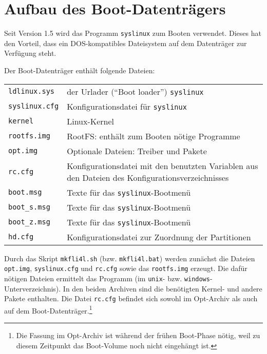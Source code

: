 \section{Aufbau des Boot-Datenträgers}

Seit Version 1.5 wird das Programm \texttt{syslinux} zum Booten verwendet.
Dieses hat den Vorteil, dass ein DOS-kompatibles Dateisystem auf dem
Datenträger zur Verfügung steht.

Der Boot-Datenträger enthält folgende Dateien:

\begin{table}[htbp]
\centering
\begin{tabular}[h!]{lp{10cm}}
\texttt{ldlinux.sys}             & der Urlader ("`Boot loader"') \texttt{syslinux} \\
\texttt{syslinux.cfg}            & Konfigurationsdatei für \texttt{syslinux} \\
\texttt{kernel}                  & Linux-Kernel\\
\texttt{rootfs.img}              & RootFS: enthält zum Booten nötige Programme\\
\texttt{opt.img}                 & Optionale Dateien: Treiber und Pakete\\
\texttt{rc.cfg}                  & Konfigurationsdatei mit den benutzten Variablen aus
den Dateien des Konfigurationsverzeichnisses\\
\texttt{boot.msg}                & Texte für das \texttt{syslinux}-Bootmenü \\
\texttt{boot\_s.msg}             & Texte für das \texttt{syslinux}-Bootmenü \\
\texttt{boot\_z.msg}             & Texte für das \texttt{syslinux}-Bootmenü \\
\texttt{hd.cfg}                  & Konfigurationsdatei zur Zuordnung der Partitionen \\
\end{tabular}
\end{table}

Durch das Skript \texttt{mkfli4l.sh} (bzw. \texttt{mkfli4l.bat}) werden zunächst
die Dateien \texttt{opt.img}, \texttt{syslinux.cfg} und \texttt{rc.cfg} sowie das \texttt{rootfs.img} erzeugt.
Die dafür nötigen Dateien ermittelt das Programm  (im \texttt{unix}- bzw.
\texttt{windows}-Unterverzeichnis). In den beiden Archiven
sind die benötigten Kernel- und andere Pakete enthalten. Die Datei
\texttt{rc.cfg} befindet sich sowohl im Opt-Archiv als auch auf dem
Boot-Datenträger.\footnote{Die Fassung im Opt-Archiv ist während der frühen
Boot-Phase nötig, weil zu diesem Zeitpunkt das Boot-Volume noch nicht
eingehängt ist.}


